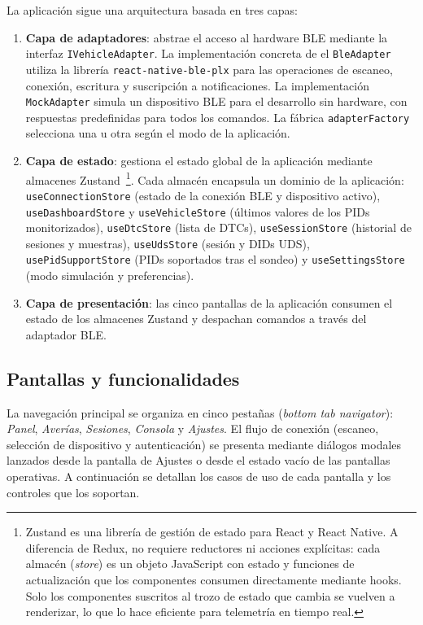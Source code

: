 La aplicación sigue una arquitectura basada en tres capas:

\begin{enumerate}
    \item \textbf{Capa de adaptadores}: abstrae el acceso al hardware BLE mediante la interfaz \texttt{IVehicleAdapter}. La implementación concreta  de el \texttt{BleAdapter} utiliza la librería \texttt{react-\allowbreak{}native-\allowbreak{}ble-\allowbreak{}plx} para las operaciones de escaneo, conexión, escritura y suscripción a notificaciones. La implementación \texttt{MockAdapter} simula un dispositivo BLE para el desarrollo sin hardware, con respuestas predefinidas para todos los comandos. La fábrica \texttt{adapterFactory} selecciona una u otra según el modo de la aplicación.

    \item \textbf{Capa de estado}: gestiona el estado global de la aplicación mediante almacenes Zustand~\cite{Zustand_lib}\footnote{Zustand es una librería de gestión de estado para React y React Native. A diferencia de Redux, no requiere reductores ni acciones explícitas: cada almacén (\textit{store}) es un objeto JavaScript con estado y funciones de actualización que los componentes consumen directamente mediante hooks. Solo los componentes suscritos al trozo de estado que cambia se vuelven a renderizar, lo que lo hace eficiente para telemetría en tiempo real.}. Cada almacén encapsula un dominio de la aplicación: \texttt{useConnectionStore} (estado de la conexión BLE y dispositivo activo), \texttt{useDashboardStore} y \texttt{useVehicleStore} (últimos valores de los PIDs monitorizados), \texttt{useDtcStore} (lista de DTCs), \texttt{useSessionStore} (historial de sesiones y muestras), \texttt{useUdsStore} (sesión y DIDs UDS), \texttt{usePidSupportStore} (PIDs soportados tras el sondeo) y \texttt{useSettingsStore} (modo simulación y preferencias).

    \item \textbf{Capa de presentación}: las cinco pantallas de la aplicación consumen el estado de los almacenes Zustand y despachan comandos a través del adaptador BLE.
\end{enumerate}

\subsection{Pantallas y funcionalidades}

La navegación principal se organiza en cinco pestañas (\textit{bottom tab navigator}): \textit{Panel}, \textit{Averías}, \textit{Sesiones}, \textit{Consola} y \textit{Ajustes}. El flujo de conexión (escaneo, selección de dispositivo y autenticación) se presenta mediante diálogos modales lanzados desde la pantalla de Ajustes o desde el estado vacío de las pantallas operativas. A continuación se detallan los casos de uso de cada pantalla y los controles que los soportan.

